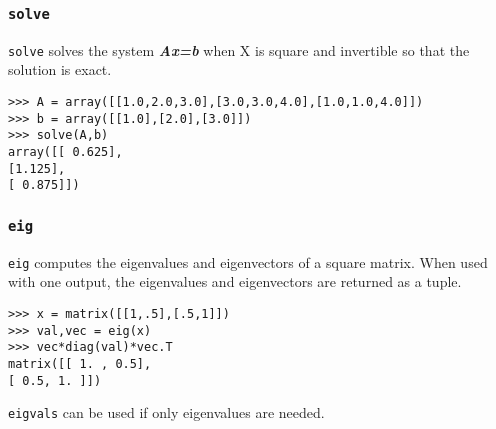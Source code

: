 \documentclass[KSmain.tex]{subfiles}
\begin{document}
\subsubsection*{\texttt{solve}}

\texttt{solve} solves the system \textit{\textbf{Ax=b}} when X is square and invertible so that the solution is exact.
\begin{framed}
\begin{verbatim}
>>> A = array([[1.0,2.0,3.0],[3.0,3.0,4.0],[1.0,1.0,4.0]])
>>> b = array([[1.0],[2.0],[3.0]])
>>> solve(A,b)
array([[ 0.625],
[1.125],
[ 0.875]])
\end{verbatim}
\end{framed}

\subsubsection*{\texttt{eig}}
\texttt{eig} computes the eigenvalues and eigenvectors of a square matrix. When used with one output, the eigenvalues
and eigenvectors are returned as a tuple.
\begin{framed}
\begin{verbatim}
>>> x = matrix([[1,.5],[.5,1]])
>>> val,vec = eig(x)
>>> vec*diag(val)*vec.T
matrix([[ 1. , 0.5],
[ 0.5, 1. ]])
\end{verbatim}
\end{framed}
\texttt{eigvals} can be used if only eigenvalues are needed.
\end{document}
